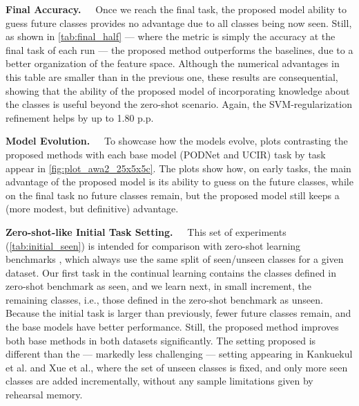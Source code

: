 \textbf{Final Accuracy.~~} Once we reach the final task, the proposed model ability to guess future
classes provides no advantage due to all classes being now seen. Still, as shown in
\autoref{tab:final_half} — where the metric is simply the accuracy at the final task of each run —
the proposed method outperforms the baselines, due to a better organization of the feature space.
Although the numerical advantages in this table are smaller than in the previous one, these results
are consequential, showing that the ability of the proposed model of incorporating knowledge about
the classes is useful beyond the zero-shot scenario. Again, the SVM-regularization refinement helps
by up to 1.80 p.p.



\textbf{Model Evolution.~~} To showcase how the models evolve, plots contrasting the proposed
methods with each base model (PODNet and UCIR) task by task appear in
\autoref{fig:plot_awa2_25x5x5c}. The plots show how, on early tasks, the main advantage of the
proposed model is its ability to guess on the future classes, while on the final task no future
classes remain, but the proposed model still keeps a (more modest, but definitive) advantage.



\textbf{Zero-shot-like Initial Task Setting.~~} This set of experiments (\autoref{tab:initial_seen})
is intended for comparison with zero-shot learning benchmarks \cite{xian2019awa2}, which always use
the same split of seen/unseen classes for a given dataset. Our first task in the continual learning
contains the classes defined in zero-shot benchmark as seen, and we learn next, in small increment,
the remaining classes, i.e., those defined in the zero-shot benchmark as unseen. Because the initial
task is larger than previously, fewer future classes remain, and the base models have better
performance. Still, the proposed method improves both base methods in both datasets significantly.
The setting proposed is different than the — markedly less challenging — setting appearing in
Kankuekul et al.\cite{kankuekul2012onlineincrementalzeroshot} and Xue et
al.\cite{xue2017incrementalzeroshot}, where the set of unseen classes is fixed, and only more seen
classes are added incrementally, without any sample limitations given by rehearsal memory.


